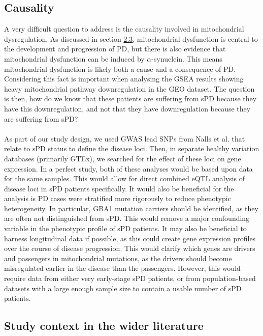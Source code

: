 \documentclass{article}
\begin{document}
\subsection{Causality}
\label{subsubsec:causality}
A very difficult question to address is the causality involved in mitochondrial dysregulation. As discussed in section \hyperref[subsubsec:mitochondria]{2.3}, mitochondrial dysfunction is central to the development and progression of PD\cite{Bartman2024MitochondrialDiseases}\cite{MoradiVastegani2023MitochondrialStrategies}, but there is also evidence that mitochondrial dysfunction can be induced by $\alpha$-synuclein\cite{Sohrabi2023CommonDisease.}. This means mitochondrial dysfunction is likely both a cause and a consequence of PD. Considering this fact is important when analysing the GSEA results showing heavy mitochondrial pathway downregulation in the GEO dataset. The question is then, how do we know that these patients are suffering from sPD because they have this downregulation, and not that they have downregulation because they are suffering from sPD? 
\\
\\As part of our study design, we used GWAS lead SNPs from Nalls et al.\cite{Nalls2019IdentificationStudies} that relate to sPD status to define the disease loci. Then, in separate healthy variation databases (primarily GTEx\cite{Aguet2020TheTissues}), we searched for the effect of these loci on gene expression. In a perfect study, both of these analyses would be based upon data for the same samples. This would allow for direct combined eQTL analysis of disease loci in sPD patients specifically. It would also be beneficial for the analysis is PD cases were stratified more rigorously to reduce phenotypic heterogeneity. In particular, GBA1 mutation carriers should be identified, as they are often not distinguished from sPD\cite{Milenkovic2022GBADisease.}. This would remove a major confounding variable in the phenotypic profile of sPD patients. It may also be beneficial to harness longitudinal data if possible, as this could create gene expression profiles over the course of disease progression. This would clarify which genes are drivers and passengers in mitochondrial mutations, as the drivers should become misregulated earlier in the disease than the passengers. However, this would require data from either very early-stage sPD patients, or from population-based datasets with a large enough sample size to contain a usable number of sPD patients.
\subsection{Study context in the wider literature}
\label{subsec:wider}
\end{document}
